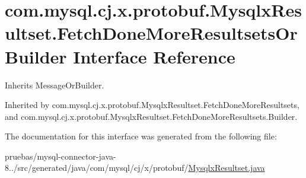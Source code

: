 \hypertarget{interfacecom_1_1mysql_1_1cj_1_1x_1_1protobuf_1_1_mysqlx_resultset_1_1_fetch_done_more_resultsets_or_builder}{}\section{com.\+mysql.\+cj.\+x.\+protobuf.\+Mysqlx\+Resultset.\+Fetch\+Done\+More\+Resultsets\+Or\+Builder Interface Reference}
\label{interfacecom_1_1mysql_1_1cj_1_1x_1_1protobuf_1_1_mysqlx_resultset_1_1_fetch_done_more_resultsets_or_builder}


Inherits Message\+Or\+Builder.



Inherited by com.\+mysql.\+cj.\+x.\+protobuf.\+Mysqlx\+Resultset.\+Fetch\+Done\+More\+Resultsets, and com.\+mysql.\+cj.\+x.\+protobuf.\+Mysqlx\+Resultset.\+Fetch\+Done\+More\+Resultsets.\+Builder.



The documentation for this interface was generated from the following file\+:\begin{DoxyCompactItemize}
\item 
pruebas/mysql-\/connector-\/java-\/8../src/generated/java/com/mysql/cj/x/protobuf/\mbox{\hyperlink{_mysqlx_resultset_8java}{Mysqlx\+Resultset.\+java}}\end{DoxyCompactItemize}
